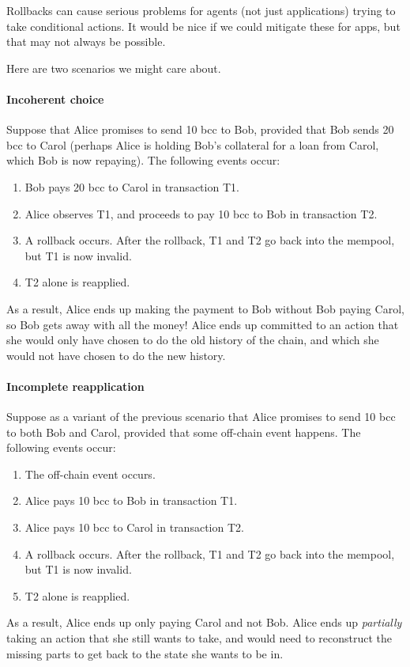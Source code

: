 \begin{requirement}
\label{req:app-rollback}
Rollbacks can cause serious problems for agents (not just applications) trying to take conditional actions.
It would be nice if we could mitigate these for \glspl{app}, but that may not always be possible.

Here are two scenarios we might care about.

\paragraph{Incoherent choice}
\label{para:incoherent-choice}
Suppose that Alice promises to send 10 \gls{bcc} to Bob, provided that Bob sends 20 \gls{bcc} to Carol (perhaps Alice is holding Bob's collateral for a loan from Carol, which Bob is now repaying).
The following events occur:
\begin{enumerate}
\item Bob pays 20 \gls{bcc} to Carol in transaction T1.
\item Alice observes T1, and proceeds to pay 10 \gls{bcc} to Bob in transaction T2.
\item A rollback occurs. After the rollback, T1 and T2 go back into the mempool, but T1 is now invalid.
\item T2 alone is reapplied.
\end{enumerate}

As a result, Alice ends up making the payment to Bob without Bob paying Carol, so Bob gets away with all the money!
Alice ends up committed to an action that she would only have chosen to do the old history of the chain, and which she would not have chosen to do the new history.

\paragraph{Incomplete reapplication}
\label{para:incomplete-reapplication}
Suppose as a variant of the previous scenario that Alice promises to send 10 \gls{bcc} to both Bob and Carol, provided that some off-chain event happens.
The following events occur:
\begin{enumerate}
\item The off-chain event occurs.
\item Alice pays 10 \gls{bcc} to Bob in transaction T1.
\item Alice pays 10 \gls{bcc} to Carol in transaction T2.
\item A rollback occurs. After the rollback, T1 and T2 go back into the mempool, but T1 is now invalid.
\item T2 alone is reapplied.
\end{enumerate}

As a result, Alice ends up only paying Carol and not Bob.
Alice ends up \emph{partially} taking an action that she still wants to take, and would need to reconstruct the missing parts to get back to the state she wants to be in.
\end{requirement}

